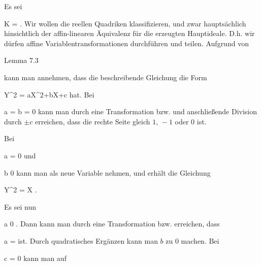 {





Es sei

\mavergleichskette
{\vergleichskette
{ K
}
{ = }{ \R
}
{  }{
}
{    }{
}
{   }{
}
}
{}{}{.}
Wir wollen die reellen Quadriken klassifizieren, und zwar hauptsächlich hinsichtlich der affin-linearen Äquivalenz für die erzeugten Hauptideale. D.h. wir dürfen affine Variablentransformationen durchführen und
 {} {}
teilen. Aufgrund von

Lemma 7.3

kann man annehmen, dass die beschreibende Gleichung die Form

\mavergleichskettedisp
{\vergleichskette
{ Y^2
}
{ =} { aX^2+bX+c
}
{ } {
}
{ } {
}
{ } {
}
}
{}{}{}
hat. Bei

\mavergleichskette
{\vergleichskette
{ a
}
{ = }{ b
}
{ = }{ 0
}
{    }{
}
{   }{
}
}
{}{}{}
kann man durch eine Transformation
 {} {}
bzw.
 {} {}
und anschließende Division durch $\pm c$ erreichen, dass die rechte Seite gleich
$1,\, -1$ oder $0$
ist.

Bei

\mavergleichskette
{\vergleichskette
{ a
}
{ = }{ 0
}
{  }{
}
{    }{
}
{   }{
}
}
{}{}{}
und

\mavergleichskette
{\vergleichskette
{ b
}
{ \neq }{ 0
}
{  }{
}
{    }{
}
{   }{
}
}
{}{}{}
kann man
 als neue Variable nehmen, und erhält die Gleichung

\mavergleichskette
{\vergleichskette
{ Y^2
}
{ = }{ X
}
{  }{
}
{    }{
}
{   }{
}
}
{}{}{.}

Es sei nun

\mavergleichskette
{\vergleichskette
{ a
}
{ \neq }{ 0
}
{  }{
}
{    }{
}
{   }{
}
}
{}{}{.}
Dann kann man durch eine Transformation
 bzw.
 erreichen, dass

\mavergleichskette
{\vergleichskette
{ a
}
{ = }{ 
}
{  }{
}
{    }{
}
{   }{
}
}
{}{}{}
ist. Durch quadratisches Ergänzen kann man $b$ zu $0$  machen. Bei

\mavergleichskette
{\vergleichskette
{ c
}
{ = }{ 0
}
{  }{
}
{    }{
}
{   }{
}
}
{}{}{}
kann man auf

}
